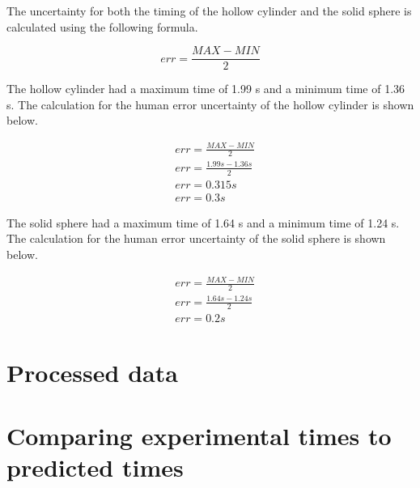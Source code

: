\documentclass[letterpaper, 12pt]{article}
\begin{document}
The uncertainty for both the timing of the hollow cylinder and
the solid sphere is calculated using the following formula.

$$
    err = \frac{MAX - MIN}{2}
$$

The hollow cylinder had a maximum time of 1.99 \unit{s} and a minimum
time of 1.36 \unit{s}. The calculation for the human error uncertainty of the hollow cylinder is
shown below.

\begin{align*}
     & err = \frac{MAX - MIN}{2}
    \\
     & err = \frac{1.99 \unit{s} - 1.36 \unit{s}}{2}
    \\
     & err = 0.315 \unit{s}
    \\
     & err = 0.3 \unit{s}
\end{align*}

The solid sphere had a maximum time of 1.64 \unit{s} and a minimum time of 1.24 \unit{s}.
The calculation for the human error uncertainty of the solid sphere is shown below.

\begin{align*}
     & err = \frac{MAX - MIN}{2}
    \\
     & err = \frac{1.64\unit{s} - 1.24\unit{s}}{2}
    \\
     & err = 0.2\unit{s}
\end{align*}

\section{Processed data}

\section{Comparing experimental times to predicted times}
\end{document}
